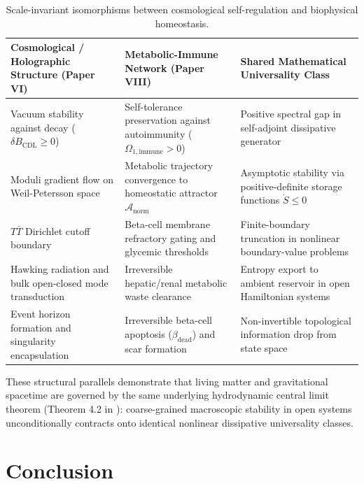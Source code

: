 \documentclass[11pt,a4paper]{article}
\begin{document}
\begin{table}[htbp]
\centering
\small
\caption{Scale-invariant isomorphisms between cosmological self-regulation and biophysical homeostasis.}
\label{tab:isomorphisms}
\begin{tabularx}{\textwidth}{>{\raggedright\arraybackslash}p{4.2cm} >{\raggedright\arraybackslash}p{5.5cm} >{\raggedright\arraybackslash}X}
\toprule
\textbf{Cosmological / Holographic Structure (Paper VI)} & \textbf{Metabolic-Immune Network (Paper VIII)} & \textbf{Shared Mathematical Universality Class} \\
\midrule
Vacuum stability against decay ($\delta B_{\mathrm{CDL}} \ge 0$) & Self-tolerance preservation against autoimmunity ($\Omega_{1,\mathrm{immune}} > 0$) & Positive spectral gap in self-adjoint dissipative generator \\
Moduli gradient flow on Weil-Petersson space & Metabolic trajectory convergence to homeostatic attractor $\mathcal{A}_{\mathrm{norm}}$ & Asymptotic stability via positive-definite storage functions $\dot{S} \le 0$ \\
$T\bar{T}$ Dirichlet cutoff boundary & Beta-cell membrane refractory gating and glycemic thresholds & Finite-boundary truncation in nonlinear boundary-value problems \\
Hawking radiation and bulk open-closed mode transduction & Irreversible hepatic/renal metabolic waste clearance & Entropy export to ambient reservoir in open Hamiltonian systems \\
Event horizon formation and singularity encapsulation & Irreversible beta-cell apoptosis ($\beta_{\mathrm{dead}}$) and scar formation & Non-invertible topological information drop from state space \\
\bottomrule
\end{tabularx}
\end{table}

These structural parallels demonstrate that living matter and gravitational spacetime are governed by the same underlying hydrodynamic central limit theorem (Theorem 4.2 in \cite{Yoshikai2026f}): coarse-grained macroscopic stability in open systems unconditionally contracts onto identical nonlinear dissipative universality classes.

\section{Conclusion}
\end{document}
